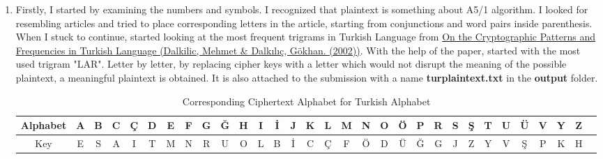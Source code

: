 \documentclass[12pt,a4paper, margin=1in]{article}
\begin{document}
\begin{enumerate}
\begin{enumerate}
            
            \item 
            Firstly, I started by examining the numbers and symbols. I recognized that plaintext is something about A5/1 algorithm. I looked for resembling articles and tried to place corresponding letters in the article, starting from conjunctions and word pairs inside parenthesis. When I stuck to continue, started looking at the most frequent trigrams in Turkish Language from \href{https://www.researchgate.net/publication/221581391_On_the_Cryptographic_Patterns_and_Frequencies_in_Turkish_Language}{On the Cryptographic Patterns and Frequencies in Turkish Language (Dalkilic, Mehmet \& Dalkılıç, Gökhan. (2002))}. With the help of the paper, started with the most used trigram "LAR". Letter by letter, by replacing cipher keys with a letter which would not disrupt the meaning of the possible plaintext, a meaningful plaintext is obtained. It is also attached to the submission with a name \textbf{turplaintext.txt} in the \textbf{output} folder.\\
            \begin{table}[!h]
                \centering
                \begin{tabular}{|c|c|c|c|c|c|c|c|c|c|c|c|c|c|c|c|c|c|c|c|c|c|c|c|c|c|c|c|c|c|c|}
                \hline
                 \tiny Alphabet &  \tiny A & \tiny B & \tiny C & \tiny Ç & \tiny D & \tiny E & \tiny F & \tiny G & \tiny Ğ & \tiny H & \tiny I & \tiny İ & \tiny J & \tiny K & \tiny L & \tiny M & \tiny N & \tiny O & \tiny Ö & \tiny P \tiny & \tiny R & \tiny S & \tiny Ş & \tiny T & \tiny U & \tiny Ü & \tiny V & \tiny Y & \tiny Z  \\
                 \hline
                 \tiny Key & \tiny E & \tiny S & \tiny A & \tiny I & \tiny T & \tiny M & \tiny N & \tiny R & \tiny U & \tiny O & \tiny L & \tiny B & \tiny İ & \tiny C & \tiny Ç & \tiny F & \tiny Ö & \tiny D & \tiny Ü & \tiny Ğ & \tiny G & \tiny J & \tiny Z & \tiny Y & \tiny V & \tiny Ş & \tiny P & \tiny K & \tiny H \\
                 \hline
                \end{tabular}
                \caption{Corresponding Ciphertext Alphabet for Turkish Alphabet}
                \label{tab:turcipher}
            \end{table}
            

\end{enumerate}
\end{enumerate}
\end{document}

